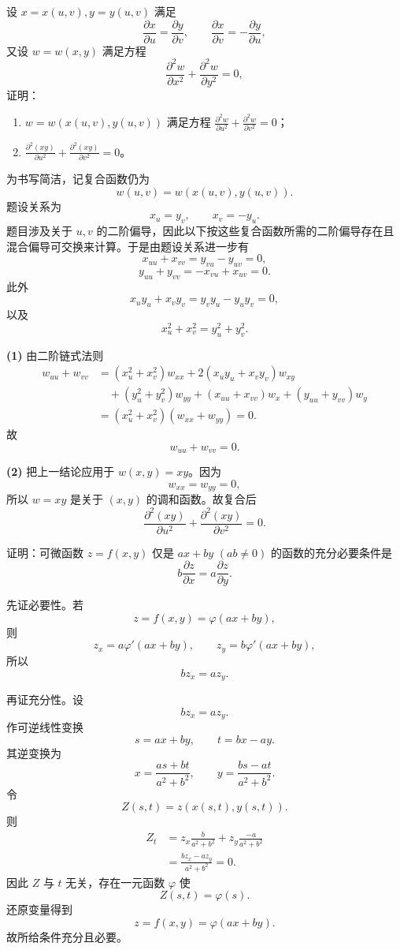 \begin{xexercise}[12]
设 $x=x(u,v),y=y(u,v)$ 满足
  \[
    \frac{\partial x}{\partial u}=\frac{\partial y}{\partial v},
    \qquad
    \frac{\partial x}{\partial v}=-\frac{\partial y}{\partial u},
  \]
  又设 $w=w(x,y)$ 满足方程
  \[
    \frac{\partial^2w}{\partial x^2}+\frac{\partial^2w}{\partial y^2}=0,
  \]
  证明：
  \begin{enumerate}[label=(\arabic*)]
    \item $w=w(x(u,v),y(u,v))$ 满足方程 $\frac{\partial^2w}{\partial u^2}+\frac{\partial^2w}{\partial v^2}=0$；
    \item $\frac{\partial^2(xy)}{\partial u^2}+\frac{\partial^2(xy)}{\partial v^2}=0$。
  \end{enumerate}
\end{xexercise}
\begin{xsolution}
为书写简洁，记复合函数仍为
\[
  w(u,v)=w(x(u,v),y(u,v)).
\]
题设关系为
\[
  x_u=y_v,
  \qquad
  x_v=-y_u.
\]
题目涉及关于 $u,v$ 的二阶偏导，因此以下按这些复合函数所需的二阶偏导存在且混合偏导可交换来计算。于是由题设关系进一步有
\[
  x_{uu}+x_{vv}=y_{vu}-y_{uv}=0,
\]
\[
  y_{uu}+y_{vv}=-x_{vu}+x_{uv}=0.
\]
此外
\[
  x_u y_u+x_v y_v
  =y_vy_u-y_uy_v=0,
\]
以及
\[
  x_u^2+x_v^2=y_u^2+y_v^2.
\]

\textbf{(1)} 由二阶链式法则
\begin{align*}
  w_{uu}+w_{vv}
  &=(x_u^2+x_v^2)w_{xx}
    +2(x_uy_u+x_vy_v)w_{xy}\\
  &\quad +(y_u^2+y_v^2)w_{yy}
    +(x_{uu}+x_{vv})w_x
    +(y_{uu}+y_{vv})w_y\\
  &=(x_u^2+x_v^2)(w_{xx}+w_{yy})=0.
\end{align*}
故
\[
  \boxed{w_{uu}+w_{vv}=0}.
\]

\textbf{(2)} 把上一结论应用于 $w(x,y)=xy$。因为
\[
  w_{xx}=w_{yy}=0,
\]
所以 $w=xy$ 是关于 $(x,y)$ 的调和函数。故复合后
\[
  \boxed{
  \frac{\partial^2(xy)}{\partial u^2}
  +\frac{\partial^2(xy)}{\partial v^2}=0}.
\]
\end{xsolution}


\begin{xexercise}[13]
证明：可微函数 $z=f(x,y)$ 仅是 $ax+by$ $(ab\ne0)$ 的函数的充分必要条件是
  \[
    b\frac{\partial z}{\partial x}=a\frac{\partial z}{\partial y}.
  \]
\end{xexercise}
\begin{xsolution}
先证必要性。若
\[
  z=f(x,y)=\varphi(ax+by),
\]
则
\[
  z_x=a\varphi'(ax+by),
  \qquad
  z_y=b\varphi'(ax+by),
\]
所以
\[
  bz_x=az_y.
\]

再证充分性。设
\[
  bz_x=az_y.
\]
作可逆线性变换
\[
  s=ax+by,
  \qquad
  t=bx-ay.
\]
其逆变换为
\[
  x=\frac{as+bt}{a^2+b^2},
  \qquad
  y=\frac{bs-at}{a^2+b^2}.
\]
令
\[
  Z(s,t)=z(x(s,t),y(s,t)).
\]
则
\begin{align*}
  Z_t
  &=z_x\frac{b}{a^2+b^2}
    +z_y\frac{-a}{a^2+b^2}\\
  &=\frac{bz_x-az_y}{a^2+b^2}=0.
\end{align*}
因此 $Z$ 与 $t$ 无关，存在一元函数 $\varphi$ 使
\[
  Z(s,t)=\varphi(s).
\]
还原变量得到
\[
  \boxed{z=f(x,y)=\varphi(ax+by)}.
\]
故所给条件充分且必要。
\end{xsolution}


